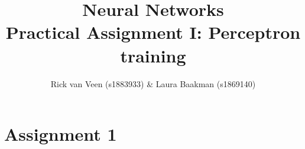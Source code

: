 \documentclass{article}
\title{Neural Networks\\Practical Assignment I: Perceptron training}
\author{Rick van Veen (s1883933) \& Laura Baakman (s1869140)}
\begin{document}
\maketitle

\section*{Assignment 1}

	
\clearpage
\appendix

\end{document}
